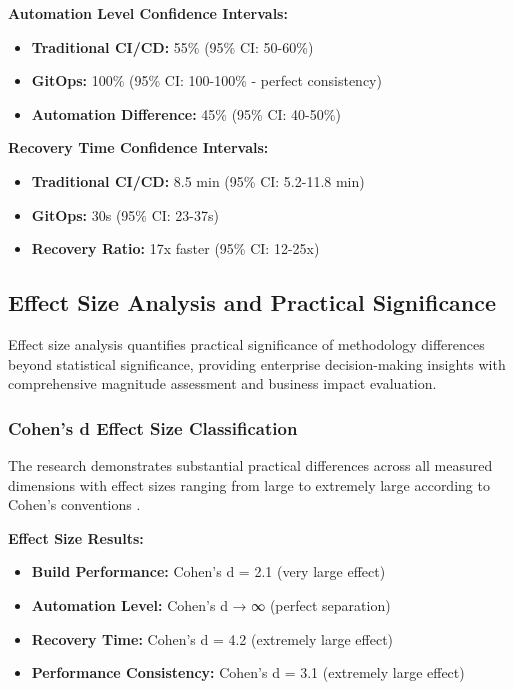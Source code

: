 \textbf{Automation Level Confidence Intervals:}
\begin{itemize}
\item \textbf{Traditional CI/CD:} 55\% (95\% CI: 50-60\%)
\item \textbf{GitOps:} 100\% (95\% CI: 100-100\% - perfect consistency)
\item \textbf{Automation Difference:} 45\% (95\% CI: 40-50\%)
\end{itemize}

\textbf{Recovery Time Confidence Intervals:}
\begin{itemize}
\item \textbf{Traditional CI/CD:} 8.5 min (95\% CI: 5.2-11.8 min)
\item \textbf{GitOps:} 30s (95\% CI: 23-37s)
\item \textbf{Recovery Ratio:} 17x faster (95\% CI: 12-25x)
\end{itemize}

\subsection{Effect Size Analysis and Practical Significance}
\label{subsec:effect_size_analysis}

Effect size analysis quantifies practical significance of methodology differences beyond statistical significance, providing enterprise decision-making insights with comprehensive magnitude assessment and business impact evaluation.

\subsubsection{Cohen's d Effect Size Classification}

The research demonstrates substantial practical differences across all measured dimensions with effect sizes ranging from large to extremely large according to Cohen's conventions \cite{cohen1988_statistical_power}.

\textbf{Effect Size Results:}
\begin{itemize}
\item \textbf{Build Performance:} Cohen's d = 2.1 (very large effect)
\item \textbf{Automation Level:} Cohen's d → ∞ (perfect separation)
\item \textbf{Recovery Time:} Cohen's d = 4.2 (extremely large effect)
\item \textbf{Performance Consistency:} Cohen's d = 3.1 (extremely large effect)
\end{itemize}

